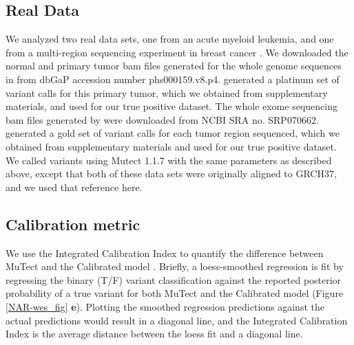 \documentclass[a4,center,fleqn]{NAR}
\begin{document}
\subsection{Real Data}
We analyzed two real data sets, one from an acute myeloid leukemia, and one from a multi-region sequencing experiment in breast cancer \cite{Griffith2015,Shi2018}.
We downloaded the normal and primary tumor bam files generated for the whole genome sequences in \citet{Griffith2015} from dbGaP accession number phs000159.v8.p4.
\citet{Griffith2015} generated a platinum set of variant calls for this primary tumor, which we obtained from supplementary materials, and used for our true positive dataset.
The whole exome sequencing bam files generated by \citet{Shi2018} were downloaded from NCBI SRA no. SRP070662.
\citet{Shi2018} generated a gold set of variant calls for each tumor region sequenced, which we obtained from supplementary materials and used for our true positive dataset.
We called variants using Mutect 1.1.7 with the same parameters as described above, except that both of these data sets were originally aligned to GRCH37, and we used that reference here.

\subsection{Calibration metric}

	We use the Integrated Calibration Index to quantify the difference between MuTect and the Calibrated model \cite{Austin2019}.
	Briefly, a loess-smoothed regression is fit by regressing the binary (T/F) variant classification against the reported posterior probability of a true variant for both MuTect and the Calibrated model (Figure \ref{NAR-wes_fig} \textbf{e}).
	Plotting the smoothed regression predictions against the actual predictions would result in a diagonal line, and the Integrated Calibration Index is the average distance between the loess fit and a diagonal line.
\end{document}

